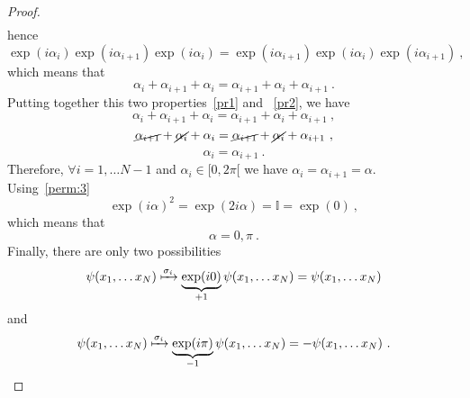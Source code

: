\begin{proof}
\begin{equation*}
\begin{aligned}
        \end{aligned}
        \end{equation*}
        hence 
        \begin{equation*}
            \exp(i \alpha_i) \exp(i \alpha_{i+1}) \exp(i \alpha_i) = \exp(i \alpha_{i+1}) \exp(i \alpha_i) \exp(i \alpha_{i+1}) ~,
        \end{equation*}
        which means that 
        \begin{equation}\label{pr2}
           \alpha_i + \alpha_{i+1} + \alpha_i = \alpha_{i+1} + \alpha_i + \alpha_{i+1} ~. 
        \end{equation}
        Putting together this two properties~\eqref{pr1} and ~\eqref{pr2}, we have
        \begin{equation*}
            \alpha_i + \alpha_{i+1} + \alpha_i = \alpha_{i+1} + \alpha_i + \alpha_{i+1} ~,
        \end{equation*}
        \begin{equation*}
            \cancel{\alpha_{i+1}} + \cancel{\alpha_i }+ \alpha_i = \cancel{\alpha_{i+1}} + \cancel{\alpha_i} + \alpha_{i+1} ~,
        \end{equation*}
        \begin{equation*}
            \alpha_i = \alpha_{i+1} ~.
        \end{equation*}
        Therefore, $\forall i= 1, \ldots N-1$ and $\alpha_i \in [0, 2\pi[$ we have $\alpha_i = \alpha_{i+1} = \alpha$.
        Using~\eqref{perm:3}
        \begin{equation*}
            \exp(i \alpha)^2 = \exp (2 i \alpha) = \mathbb I = \exp(0) ~,
        \end{equation*}
        which means that 
        \begin{equation*}
            \alpha = 0, \pi ~.
        \end{equation*}
        Finally, there are only two possibilities 
        \begin{equation*}
            \psi(x_1, \ldots x_N) \xmapsto{\sigma_i} \underbrace{\exp(i 0)}_{+1} \psi(x_1, \ldots x_N) = \psi(x_1, \ldots x_N)
        \end{equation*}
        and 
        \begin{equation*}
            \psi(x_1, \ldots x_N) \xmapsto{\sigma_i} \underbrace{\exp(i \pi)}_{-1} \psi(x_1, \ldots x_N) = - \psi(x_1, \ldots x_N)~.
        \end{equation*}
    \end{proof}

